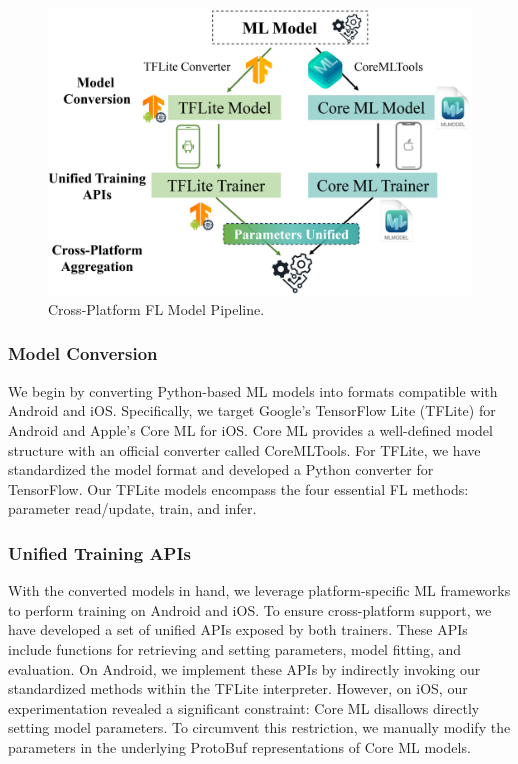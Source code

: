 \documentclass[letterpaper]{article} %
\begin{document}
\begin{figure}
    \centering
    \includegraphics*[width=\linewidth]{cross_smart_fl_workflow.pdf}
    \caption{Cross-Platform FL Model Pipeline.}
    \label{cross_fl}
\end{figure}

\subsubsection{Model Conversion}
We begin by converting Python-based ML models into formats compatible with
Android and iOS.
Specifically, we target Google's TensorFlow Lite (TFLite) for Android and
Apple's Core ML for iOS.
Core ML provides a well-defined model structure with
an official converter called CoreMLTools.
For TFLite, we have standardized the model format and
developed a Python converter for TensorFlow.
Our TFLite models encompass the four essential FL methods:
parameter read/update, train, and infer.

\subsubsection{Unified Training APIs}
With the converted models in hand,
we leverage platform-specific ML frameworks to
perform training on Android and iOS.
To ensure cross-platform support,
we have developed a set of unified APIs exposed by both trainers.
These APIs include functions for retrieving and setting parameters,
model fitting, and evaluation.
On Android, we implement these APIs by indirectly invoking
our standardized methods within the TFLite interpreter.
However, on iOS, our experimentation revealed a significant constraint:
Core ML disallows directly setting model parameters.
To circumvent this restriction,
we manually modify the parameters in the underlying ProtoBuf representations of
Core ML models.
\end{document}
